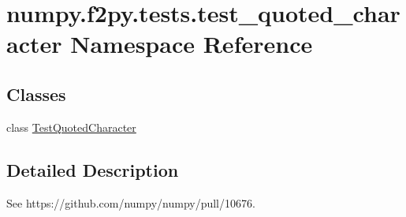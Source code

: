 \hypertarget{namespacenumpy_1_1f2py_1_1tests_1_1test__quoted__character}{}\section{numpy.\+f2py.\+tests.\+test\+\_\+quoted\+\_\+character Namespace Reference}
\label{namespacenumpy_1_1f2py_1_1tests_1_1test__quoted__character}
\subsection*{Classes}
\begin{DoxyCompactItemize}
\item 
class \hyperlink{classnumpy_1_1f2py_1_1tests_1_1test__quoted__character_1_1TestQuotedCharacter}{Test\+Quoted\+Character}
\end{DoxyCompactItemize}


\subsection{Detailed Description}
\begin{DoxyVerb}See https://github.com/numpy/numpy/pull/10676.\end{DoxyVerb}
 